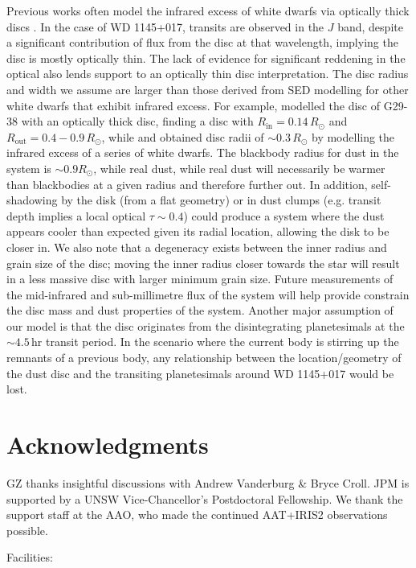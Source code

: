 \documentclass[apj]{emulateapj}
\begin{document}
Previous works often model the infrared excess of white dwarfs via optically thick discs \citep[e.g.][]{2003ApJ...584L..91J,2009ApJ...694..805F}. In the case of WD 1145+017, transits are observed in the $J$ band, despite a significant contribution of flux from the disc at that wavelength, implying the disc is mostly optically thin. The lack of evidence for significant reddening in the optical also lends support to an optically thin disc interpretation. The disc radius and width we assume are larger than those derived from SED modelling for other white dwarfs that exhibit infrared excess. For example, \citet{2003ApJ...584L..91J} modelled the disc of G29-38 with an optically thick disc, finding a disc with $R_\mathrm{in} = 0.14\,R_\odot$ and $R_\mathrm{out} = 0.4-0.9\,R_\odot$, while \citet{2009ApJ...694..805F} and \citet{2014ApJ...786...77B} obtained disc radii of $\sim 0.3\,R_\odot$ by modelling the infrared excess of a series of white dwarfs. The blackbody radius for dust in the system is $\sim 0.9 R_\odot$, while real dust, while real dust will necessarily be warmer than blackbodies at a given radius and therefore further out. In addition, self-shadowing by the disk (from a flat geometry) or in dust clumps (e.g. transit depth implies a local optical $\tau \sim 0.4$) could produce a system where the dust appears cooler than expected given its radial location, allowing the disk to be closer in. We also note that a degeneracy exists between the inner radius and grain size of the disc; moving the inner radius closer towards the star will result in a less massive disc with larger minimum grain size. Future measurements of the mid-infrared and sub-millimetre flux of the system will help provide constrain the disc mass and dust properties of the system. Another major assumption of our model is that the disc originates from the disintegrating planetesimals at the $\sim 4.5$\,hr transit period. In the scenario where the current body is stirring up the remnants of a previous body, any relationship between the location/geometry of the dust disc and the transiting planetesimals around WD 1145+017 would be lost.




\section{Acknowledgments}
GZ thanks insightful discussions with Andrew Vanderburg \& Bryce Croll. JPM is supported by a UNSW Vice-Chancellor's Postdoctoral Fellowship. We thank the support staff at the AAO, who made the continued AAT+IRIS2 observations possible. 

Facilities: 



\end{document}
